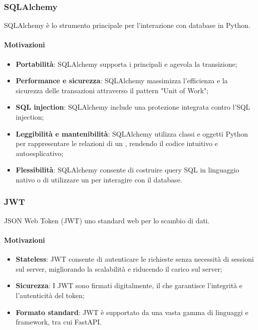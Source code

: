 \subsubsection{SQLAlchemy}\label{sec:sqlalchemy}
\par SQLAlchemy è lo strumento principale per l'interazione con database  in Python.
\paragraph*{Motivazioni}
\begin{itemize}
  \item \textbf{Portabilità}: SQLAlchemy supporta i principali  e agevola la transizione;
  \item \textbf{Performance e sicurezza}: SQLAlchemy massimizza l'efficienza e la sicurezza delle transazioni attraverso il pattern "Unit of Work";
  \item \textbf{SQL injection}: SQLAlchemy include una protezione integrata contro l'SQL injection;
  \item \textbf{Leggibilità e mantenibilità}: SQLAlchemy utilizza classi e oggetti Python per rappresentare le relazioni di un , rendendo il codice intuitivo e autoesplicativo;
  \item \textbf{Flessibilità}: SQLAlchemy consente di costruire query SQL in linguaggio nativo o di utilizzare un  per interagire con il database.
\end{itemize}

\subsubsection{JWT}\label{sec:jwt}
\par JSON Web Token (JWT) uno standard web per lo scambio di dati.
\paragraph*{Motivazioni}
\begin{itemize}
  \item \textbf{Stateless}: JWT consente di autenticare le richieste senza necessità di sessioni sul server, migliorando la scalabilità e riducendo il carico sul server;
  \item \textbf{Sicurezza}: I JWT sono firmati digitalmente, il che garantisce l'integrità e l'autenticità del token;
  \item \textbf{Formato standard}: JWT è supportato da una vasta gamma di linguaggi e framework, tra cui FastAPI.
\end{itemize}

